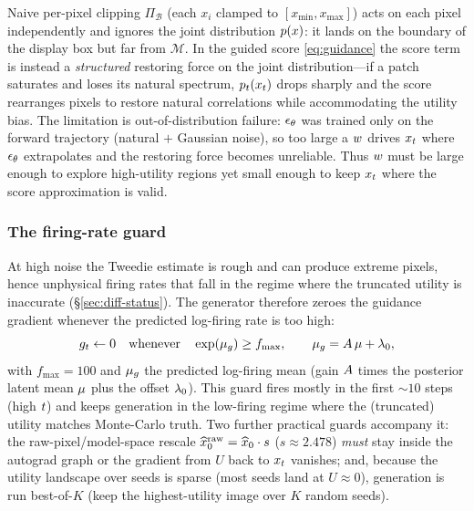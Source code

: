 \begin{remark}
Naive per-pixel clipping $\Pi_{\mathcal{B}}$ (each $x_{i}$ clamped to
$[x_{\min},x_{\max}]$) acts on each pixel independently and ignores the joint
distribution $p(x)$: it lands on the boundary of the display box but far from
$\mathcal{M}$. In
the guided score \eqref{eq:guidance} the score term is instead a \emph{structured}
restoring force on the joint distribution---if a patch saturates and loses its
natural spectrum, $p_{t}(x_{t})$ drops sharply and the score rearranges pixels to
restore natural correlations while accommodating the utility bias. The limitation
is out-of-distribution failure: $\epsilon_{\theta}$ was trained only on the forward
trajectory (natural $+$ Gaussian noise), so too large a $w$ drives $x_{t}$ where
$\epsilon_{\theta}$ extrapolates and the restoring force becomes unreliable. Thus $w$ must
be large enough to explore high-utility regions yet small enough to keep $x_{t}$
where the score approximation is valid.
\end{remark}

\subsubsection{The firing-rate guard}
At high noise the Tweedie estimate is rough and can produce extreme pixels, hence
unphysical firing rates that fall in the regime where the truncated utility is
inaccurate (\S\ref{sec:diff-status}). The generator therefore zeroes the guidance
gradient whenever the predicted log-firing rate is too high:
\begin{equation}
g_{t}\leftarrow 0
\quad\text{whenever}\quad
\exp(\mu_{g})\ge f_{\max},
\qquad
\mu_{g}=A\,\mu+\lambda_{0},
\label{eq:fmax}
\end{equation}
with $f_{\max}=100$ and $\mu_{g}$ the predicted log-firing mean (gain $A$ times
the posterior latent mean $\mu$ plus the offset $\lambda_{0}$). This guard fires
mostly in the first $\sim\!10$ steps (high $t$) and keeps generation in the
low-firing regime where the (truncated) utility matches Monte-Carlo truth. Two
further practical guards accompany it: the raw-pixel/model-space rescale
$\widehat{x}_{0}^{\mathrm{raw}}=\widehat{x}_{0}\cdot s$ ($s\approx2.478$) \emph{must} stay inside the
autograd graph or the gradient from $U$ back to $x_{t}$ vanishes; and, because the
utility landscape over seeds is sparse (most seeds land at $U\!\approx\!0$),
generation is run best-of-$K$ (keep the highest-utility image over $K$ random
seeds).

